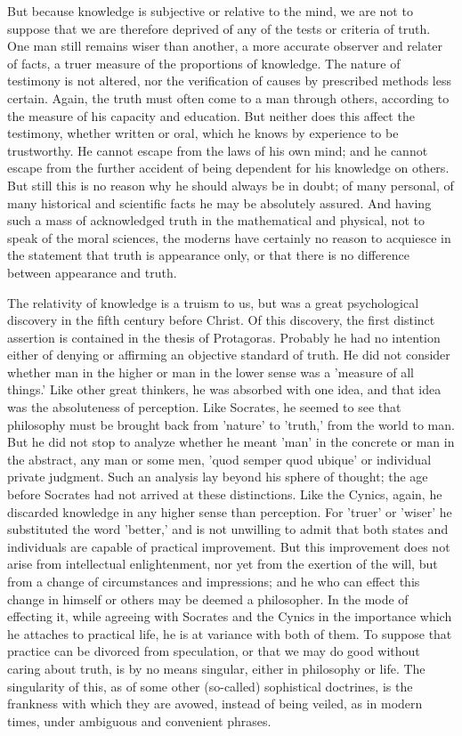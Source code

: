 But because knowledge is subjective or relative to the mind, we are
not to suppose that we are therefore deprived of any of the tests or
criteria of truth. One man still remains wiser than another, a
more accurate observer and relater of facts, a truer measure of the
proportions of knowledge. The nature of testimony is not altered, nor
the verification of causes by prescribed methods less certain. Again,
the truth must often come to a man through others, according to the
measure of his capacity and education. But neither does this affect the
testimony, whether written or oral, which he knows by experience to
be trustworthy. He cannot escape from the laws of his own mind; and
he cannot escape from the further accident of being dependent for his
knowledge on others. But still this is no reason why he should always be
in doubt; of many personal, of many historical and scientific facts he
may be absolutely assured. And having such a mass of acknowledged truth
in the mathematical and physical, not to speak of the moral sciences,
the moderns have certainly no reason to acquiesce in the statement
that truth is appearance only, or that there is no difference between
appearance and truth.

The relativity of knowledge is a truism to us, but was a great
psychological discovery in the fifth century before Christ. Of this
discovery, the first distinct assertion is contained in the thesis of
Protagoras. Probably he had no intention either of denying or affirming
an objective standard of truth. He did not consider whether man in the
higher or man in the lower sense was a 'measure of all things.' Like
other great thinkers, he was absorbed with one idea, and that idea was
the absoluteness of perception. Like Socrates, he seemed to see that
philosophy must be brought back from 'nature' to 'truth,' from the world
to man. But he did not stop to analyze whether he meant 'man' in the
concrete or man in the abstract, any man or some men, 'quod semper quod
ubique' or individual private judgment. Such an analysis lay beyond
his sphere of thought; the age before Socrates had not arrived at these
distinctions. Like the Cynics, again, he discarded knowledge in any
higher sense than perception. For 'truer' or 'wiser' he substituted
the word 'better,' and is not unwilling to admit that both states and
individuals are capable of practical improvement. But this improvement
does not arise from intellectual enlightenment, nor yet from
the exertion of the will, but from a change of circumstances and
impressions; and he who can effect this change in himself or others may
be deemed a philosopher. In the mode of effecting it, while agreeing
with Socrates and the Cynics in the importance which he attaches to
practical life, he is at variance with both of them. To suppose that
practice can be divorced from speculation, or that we may do good
without caring about truth, is by no means singular, either in
philosophy or life. The singularity of this, as of some other
(so-called) sophistical doctrines, is the frankness with which they are
avowed, instead of being veiled, as in modern times, under ambiguous and
convenient phrases.

